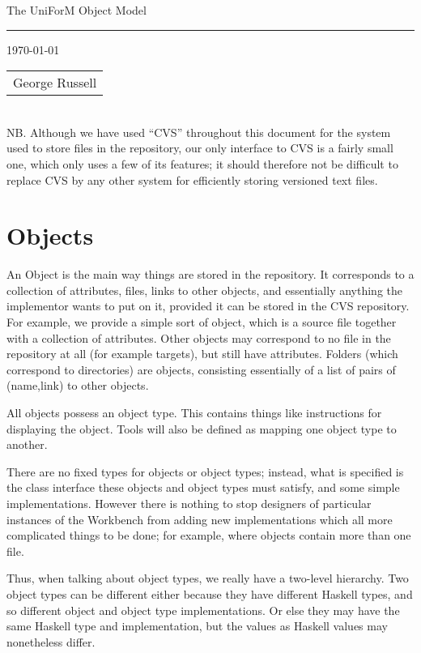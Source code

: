 \documentclass[a4paper]{article}
\begin{document}
{\Large{The UniForM Object Model}}

\rule{\textwidth}{.2pt} 


\today 
\hfill
\begin{tabular}[t]{l}
George Russell \\
\end{tabular}\\[3ex]
NB.  Although we have used ``CVS'' throughout this document for the
system used to store files in the repository, our only interface to
CVS is a fairly small one, which only uses a few of its features;
it should therefore not be difficult to replace CVS by any other
system for efficiently storing versioned text files.
\section{Objects}
An Object is the main way things are stored in the repository.  It corresponds
to
a collection of attributes, files, links to other objects, and essentially
anything the implementor wants to put on it, provided it can be stored in the
CVS repository.  For example, we provide a simple sort of object, which is
a source file together with a collection of attributes.  Other objects may
correspond to no file in the repository at all (for example targets), but
still have attributes.  Folders (which correspond to directories) are objects,
consisting essentially of a list of pairs of (name,link) to other objects.

All objects possess an object type.  This contains things like instructions
for displaying the object.  Tools will also be defined as mapping one object
type to another.

There are no fixed types for objects or object types; instead, what is 
specified is the class interface these objects and object types must satisfy,
and some simple implementations.  However there is nothing to stop designers
of particular instances of the Workbench from adding new implementations which
all more complicated things to be done; for example, where objects contain
more than one file.

Thus, when talking about object types, we really have a two-level hierarchy.
Two object types can be different either because they have different Haskell
types, and so different object and object type implementations.  Or else
they may have the same Haskell type and implementation, but the values as
Haskell values may nonetheless differ.
\end{document}
